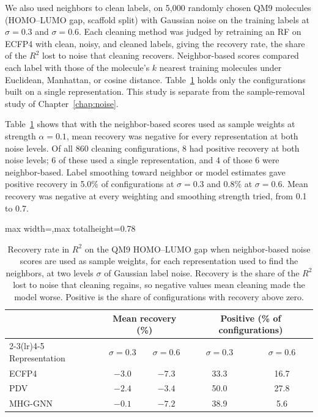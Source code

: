 We also used neighbors to clean labels, on 5,000 randomly chosen QM9 molecules (HOMO--LUMO gap, scaffold split) with Gaussian noise on the training labels at $\sigma = 0.3$ and $\sigma = 0.6$. Each cleaning method was judged by retraining an RF on ECFP4 with clean, noisy, and cleaned labels, giving the recovery rate, the share of the $R^2$ lost to noise that cleaning recovers. Neighbor-based scores compared each label with those of the molecule's $k$ nearest training molecules under Euclidean, Manhattan, or cosine distance. Table~\ref{tab:code_input_neighbor_recovery} holds only the configurations built on a single representation. This study is separate from the sample-removal study of Chapter~\ref{chap:noise}.

Table~\ref{tab:code_input_neighbor_recovery} shows that with the neighbor-based scores used as sample weights at strength $\alpha = 0.1$, mean recovery was negative for every representation at both noise levels. Of all 860 cleaning configurations, 8 had positive recovery at both noise levels; 6 of these used a single representation, and 4 of those 6 were neighbor-based. Label smoothing toward neighbor or model estimates gave positive recovery in 5.0\% of configurations at $\sigma = 0.3$ and 0.8\% at $\sigma = 0.6$. Mean recovery was negative at every weighting and smoothing strength tried, from 0.1 to 0.7.

\begin{table}[htbp]
\centering
\begin{adjustbox}{max width=\textwidth,max totalheight=0.78\textheight}
\begin{tabular}{lcccc}
\toprule
 & \multicolumn{2}{c}{Mean recovery (\%)} & \multicolumn{2}{c}{Positive (\% of configurations)} \\
\cmidrule(lr){2-3}\cmidrule(lr){4-5}
Representation & $\sigma = 0.3$ & $\sigma = 0.6$ & $\sigma = 0.3$ & $\sigma = 0.6$ \\
\midrule
ECFP4   & $-3.0$ & $-7.3$ & 33.3 & 16.7 \\
PDV     & $-2.4$ & $-3.4$ & 50.0 & 27.8 \\
MHG-GNN & $-0.1$ & $-7.2$ & 38.9 & 5.6 \\
\bottomrule
\end{tabular}
\end{adjustbox}
\caption[Recovery with neighbor-based sample weights by representation.]{Recovery rate in $R^2$ on the QM9 HOMO--LUMO gap when neighbor-based noise scores are used as sample weights, for each representation used to find the neighbors, at two levels $\sigma$ of Gaussian label noise. Recovery is the share of the $R^2$ lost to noise that cleaning regains, so negative values mean cleaning made the model worse. Positive is the share of configurations with recovery above zero.}
\label{tab:code_input_neighbor_recovery}
\end{table}

